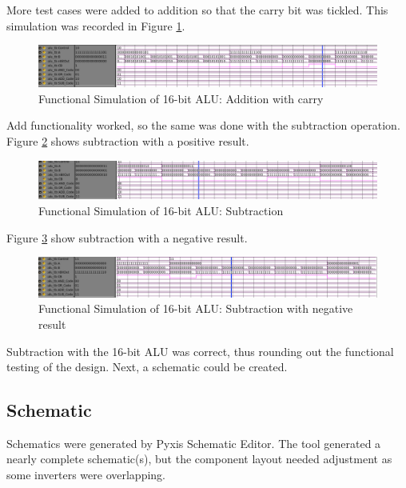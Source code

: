 \documentclass[11pt]{article}
\begin{document}
			More test cases were added to addition so that the carry bit was tickled. This simulation was recorded in Figure \ref{fig:16-bit-alu-add-carry}.
			
			\begin{figure}[H]
				\centering
				\includegraphics[width=0.7\linewidth]{"Pictures/16 Bit ALU Add Carry"}
				\caption{Functional Simulation of 16-bit ALU: Addition with carry}
				\label{fig:16-bit-alu-add-carry}
			\end{figure}
			
			Add functionality worked, so the same was done with the subtraction operation. Figure \ref{fig:16-bit-alu-sub-pos} shows subtraction with a positive result.
			
			\begin{figure}[H]
				\centering
				\includegraphics[width=0.7\linewidth]{"Pictures/16 Bit Alu Sub Pos"}
				\caption{Functional Simulation of 16-bit ALU: Subtraction}
				\label{fig:16-bit-alu-sub-pos}
			\end{figure}
		
			Figure \ref{fig:16-bit-alu-sub-neg} show subtraction with a negative result.
			
			\begin{figure}[H]
				\centering
				\includegraphics[width=0.7\linewidth]{"Pictures/16 Bit ALU Sub Neg"}
				\caption{Functional Simulation of 16-bit ALU: Subtraction with negative result}
				\label{fig:16-bit-alu-sub-neg}
			\end{figure}
		
			Subtraction with the 16-bit ALU was correct, thus rounding out the functional testing of the design. Next, a schematic could be created.

	\subsection{Schematic}
	
		Schematics were generated by Pyxis Schematic Editor. The tool generated a nearly complete schematic(s), but the component layout needed adjustment as some inverters were overlapping. 
\end{document}
